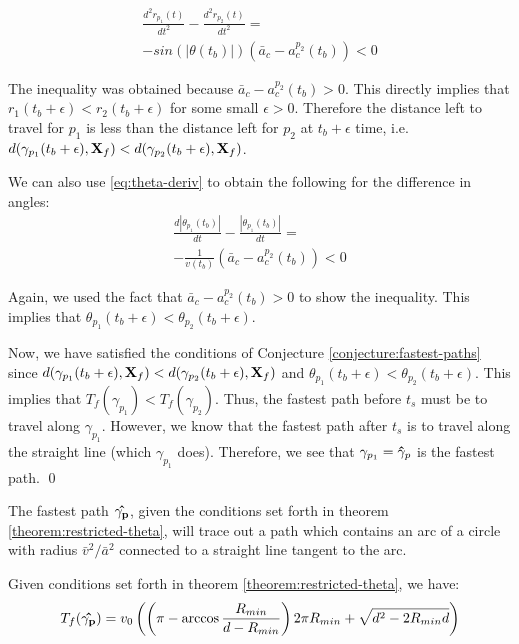 \begin{eqnarray}
  \frac{d^2 r_{p_1}(t)}{d t^2} - \frac{d^2 r_{p_2}(t)}{d t^2} = \\
  - sin(| \theta(t_b) |) \left( \bar{a}_c - a^{p_2}_c(t_b) \right) < 0
\end{eqnarray}

The inequality was obtained because $\bar{a}_c - a^{p_2}_c(t_b) > 0$. This directly implies that $r_1(t_b + \epsilon) < r_2(t_b + \epsilon)$ for some small $\epsilon > 0$. Therefore the distance left to travel for $p_1$ is less than the distance left for $p_2$ at $t_b + \epsilon$ time, i.e. $d(\gamma_{p_1}(t_b + \epsilon), \mathbf{X}_f) < d(\gamma_{p_2}(t_b + \epsilon), \mathbf{X}_f)$.

We can also use \ref{eq:theta-deriv} to obtain the following for the difference in angles:
\begin{eqnarray}
  \frac{d | \theta_{p_1}(t_b) |}{dt} - \frac{ |\theta_{p_1} (t_b) |}{dt} = \\
  - \frac{1}{v(t_b)} \left(\bar{a}_c - a^{p_2}_c(t_b) \right) < 0
\end{eqnarray}

Again, we used the fact that $\bar{a}_c - a^{p_2}_c(t_b) > 0$ to show the inequality. This implies that $\theta_{p_1}(t_b + \epsilon) < \theta_{p_2}(t_b + \epsilon)$.

Now, we have satisfied the conditions of Conjecture \ref{conjecture:fastest-paths} since $d(\gamma_{p_1}(t_b + \epsilon), \mathbf{X}_f) < d(\gamma_{p_2}(t_b + \epsilon), \mathbf{X}_f)$ and $\theta_{p_1}(t_b + \epsilon) < \theta_{p_2}(t_b + \epsilon)$. This implies that $T_f(\gamma_{p_1}) < T_f(\gamma_{p_2})$. Thus, the fastest path before $t_s$ must be to travel along $\gamma_{p_1}$. However, we know that the fastest path after $t_s$ is to travel along the straight line (which $\gamma_{p_1}$ does). Therefore, we see that $\gamma_{p_1} = \mathbf{\hat{\gamma}}_p$ is the fastest path.
\qed

\begin{corollary}
  The fastest path $\mathbf{\hat{\gamma_p}}$, given the conditions set forth in theorem \ref{theorem:restricted-theta}, will trace out a path which contains an arc of a circle with radius $\bar{v}^2 / \bar{a}^2$ connected to a straight line tangent to the arc.
\end{corollary}

\begin{corollary}
  Given conditions set forth in theorem \ref{theorem:restricted-theta}, we have:
  \begin{eqnarray}
    T_f(\mathbf{\hat{\gamma_p}}) = v_0 \left( \left( \pi - \arccos \frac{R_{min}}{d - R_{min}} \right) 2 \pi R_{min}  + \sqrt{d^2 - 2 R_{min} d}  \right)
  \end{eqnarray}
\end{corollary}
